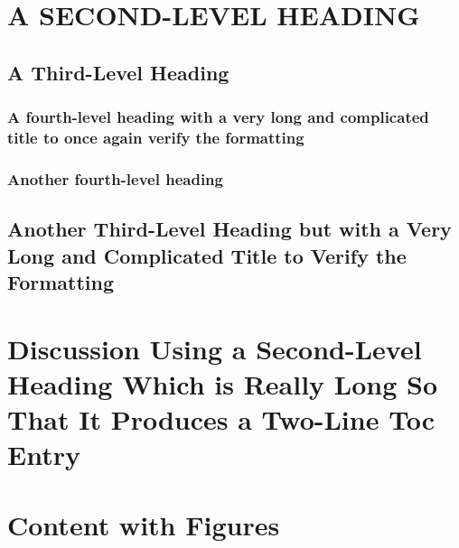 


\lipsum[6]

\section{A SECOND-LEVEL HEADING}
\lipsum[7-9]

\subsection{A Third-Level Heading}
\lipsum[10]
\subsubsection{A fourth-level heading with a very long and complicated title
to once again verify the formatting}
\lipsum[10-12]
\subsubsection{Another fourth-level heading}
\lipsum[10-12]

\subsection{Another Third-Level Heading but with a Very Long and
  Complicated Title to Verify the Formatting}
\lipsum[13-15]

\section{Discussion Using a Second-Level Heading
  Which is Really Long So That It Produces a Two-Line
  Toc Entry}
\lipsum[10-12]

\section{Content with Figures}
\lipsum[10]

